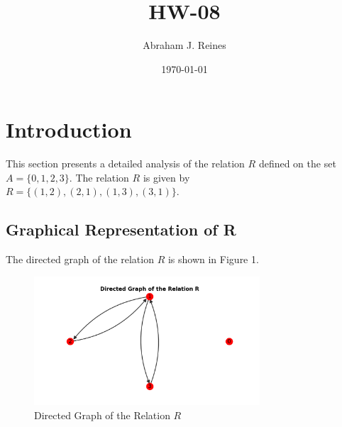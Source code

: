 \documentclass[12pt]{article}
\begin{document}
\doublespacing %

\title{HW-08}
\author{Abraham J. Reines}
\date{\today}
\maketitle

\section{Introduction}
This section presents a detailed analysis of the relation \( R \) defined on the set \( A = \{ 0, 1, 2, 3 \} \). The relation \( R \) is given by \( R = \{ (1,2), (2,1), (1,3), (3,1) \} \).

\subsection{Graphical Representation of R}
The directed graph of the relation \( R \) is shown in Figure 1.

\begin{figure}[h]
    \centering
    \includegraphics[width=0.75\textwidth]{Figure2.png} 
    \caption{Directed Graph of the Relation \( R \)}
    \label{fig:graphR}
\end{figure}
\end{document}
